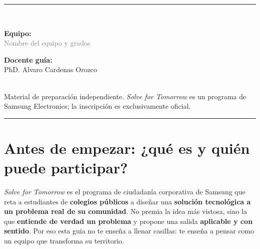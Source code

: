 \documentclass[11pt, letterpaper]{article}
\begin{document}
\begin{titlepage}
\begin{center}
  {\color{smjDorado}\rule{0.5\linewidth}{0.5pt}}\\[0.6cm]
  \begin{minipage}{0.46\textwidth}\begin{flushleft}
    \textbf{\sffamily\color{smjAzul} Equipo:}\\ \textcolor{gray}{Nombre del equipo y grados}
  \end{flushleft}\end{minipage}\hfill
  \begin{minipage}{0.46\textwidth}\begin{flushright}
    \textbf{\sffamily\color{smjAzul} Docente guía:}\\ PhD. Alvaro Cardenas Orozco
  \end{flushright}\end{minipage}\\[1.6cm]

  {\footnotesize\color{gray} Material de preparación independiente. \emph{Solve for Tomorrow} es un programa de Samsung Electronics; la inscripción es exclusivamente oficial.}\\[0.3cm]
  {\color{smjAzul}\rule{\linewidth}{2pt}}
\end{center}
\end{titlepage}

\section{Antes de empezar: ¿qué es y quién puede participar?}

\emph{Solve for Tomorrow} es el programa de ciudadanía corporativa de Samsung que reta a estudiantes de \textbf{colegios públicos} a diseñar una \textbf{solución tecnológica a un problema real de su comunidad}. No premia la idea más vistosa, sino la que \textbf{entiende de verdad un problema} y propone una salida \textbf{aplicable y con sentido}. Por eso esta guía no te enseña a llenar casillas: te enseña a pensar como un equipo que transforma su territorio.
\end{document}
